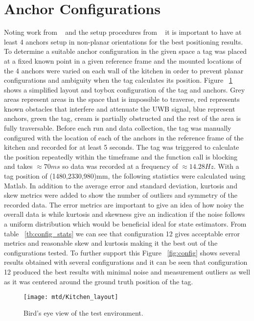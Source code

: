 \section{Anchor Configurations}\label{sec:anchor-configurations}
Noting work from ~\citet{di2019evaluation} and the setup procedures from ~\citet{pozyx2018pozyx} it is important to have at least 4 anchors setup in non-planar orientations for the best positioning results.
To determine a suitable anchor configuration in the given space a tag was placed at a fixed known point in a given reference frame and the mounted locations of the 4 anchors were varied on each wall of the kitchen in order to prevent planar configurations and ambiguity when the tag calculates its position.
Figure ~\ref{fig:layout} shows a simplified layout and toybox configuration of the tag and anchors.
Grey areas represent areas in the space that is impossible to traverse, red represents known obstacles that interfere and attenuate the UWB signal, blue represent anchors, green the tag, cream is partially obstructed and the rest of the area is fully traversable.
Before each run and data collection, the tag was manually configured with the location of each of the anchors in the reference frame of the kitchen and recorded for at least 5 seconds.
The tag was triggered to calculate the position repeatedly within the timeframe and the function call is blocking and takes $\approx70ms$ so data was recorded at a frequency of $\approx14.28Hz$.
With a tag position of (1480,2330,980)mm, the following statistics were calculated using Matlab.
In addition to the average error and standard deviation,  kurtosis and skew metrics were added to show the number of outliers and symmetry of the recorded data.
The error metrics are important to give an idea of how noisy the overall data is while kurtosis and skewness give an indication if the noise follows a uniform distribution which would be beneficial ideal for state estimators.
From table ~\ref{tb:config_stats} we can see that configuration 12 gives acceptable error metrics and reasonable skew and kurtosis making it the best out of the configurations tested.
To further support this Figure ~\ref{fig:config} shows several results obtained with several configurations and it can be seen that configuration 12 produced the best results with minimal noise and measurement outliers as well as it was centered around the ground truth position of the tag.

\begin{figure}[h!]
    \centering
    \texttt{[image: mtd/Kitchen\_layout]}
    \caption{Bird's eye view of the test environment.}
    \label{fig:layout}
\end{figure}
\newpage

